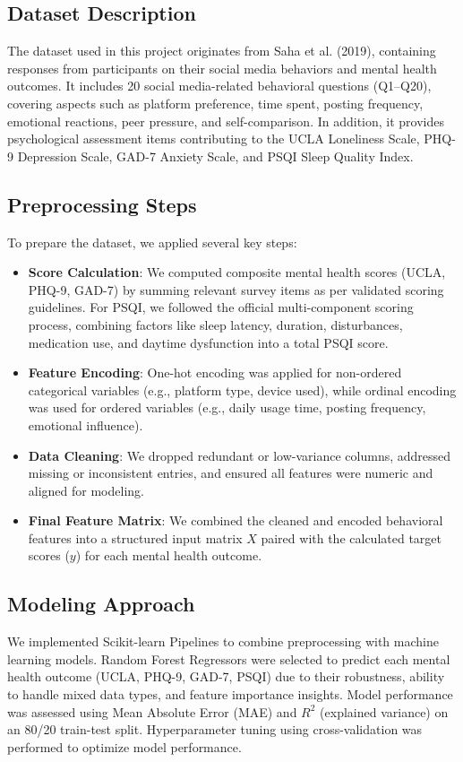 \documentclass[twocolumn,numbers]{article}
\begin{document}
\subsection{Dataset Description}
The dataset used in this project originates from Saha et al. (2019), containing responses from participants on their social media behaviors and mental health outcomes. It includes 20 social media-related behavioral questions (Q1--Q20), covering aspects such as platform preference, time spent, posting frequency, emotional reactions, peer pressure, and self-comparison.  
In addition, it provides psychological assessment items contributing to the UCLA Loneliness Scale, PHQ-9 Depression Scale, GAD-7 Anxiety Scale, and PSQI Sleep Quality Index.

\subsection{Preprocessing Steps}
To prepare the dataset, we applied several key steps:
\begin{itemize}
    \item \textbf{Score Calculation}: We computed composite mental health scores (UCLA, PHQ-9, GAD-7) by summing relevant survey items as per validated scoring guidelines. For PSQI, we followed the official multi-component scoring process, combining factors like sleep latency, duration, disturbances, medication use, and daytime dysfunction into a total PSQI score.
    \item \textbf{Feature Encoding}: One-hot encoding was applied for non-ordered categorical variables (e.g., platform type, device used), while ordinal encoding was used for ordered variables (e.g., daily usage time, posting frequency, emotional influence).
    \item \textbf{Data Cleaning}: We dropped redundant or low-variance columns, addressed missing or inconsistent entries, and ensured all features were numeric and aligned for modeling.
    \item \textbf{Final Feature Matrix}: We combined the cleaned and encoded behavioral features into a structured input matrix $X$ paired with the calculated target scores ($y$) for each mental health outcome.
\end{itemize}

\subsection{Modeling Approach}
We implemented Scikit-learn Pipelines to combine preprocessing with machine learning models. Random Forest Regressors were selected to predict each mental health outcome (UCLA, PHQ-9, GAD-7, PSQI) due to their robustness, ability to handle mixed data types, and feature importance insights.  
Model performance was assessed using Mean Absolute Error (MAE) and $R^2$ (explained variance) on an 80/20 train-test split. Hyperparameter tuning using cross-validation was performed to optimize model performance.
\end{document}
